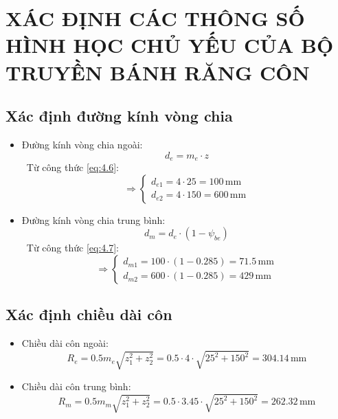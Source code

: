     \section{XÁC ĐỊNH CÁC THÔNG SỐ HÌNH HỌC CHỦ YẾU CỦA BỘ TRUYỀN BÁNH RĂNG CÔN}
        \subsection{Xác định đường kính vòng chia}
            \begin{itemize}
                \item Đường kính vòng chia ngoài:
                    \begin{equation}
                        d_e = m_e \cdot z
                        \label{eq:4.6}
                    \end{equation}\
                    Từ công thức \ref{eq:4.6}:
                    \[
                    \Rightarrow
                    \begin{cases}
                        d_{e1} = 4 \cdot 25 = 100 \, \mathrm{mm} \\
                        d_{e2} = 4 \cdot 150 = 600 \, \mathrm{mm}
                    \end{cases}
                    \]
                \item Đường kính vòng chia trung bình:\\
                    \begin{equation}
                        d_m = d_e \cdot (1 - \psi_{be})
                        \label{eq:4.7}
                    \end{equation}\
                    Từ công thức \ref{eq:4.7}:
                    \[
                    \Rightarrow
                    \begin{cases}
                        d_{m1} = 100 \cdot (1 - 0.285) = 71.5 \, \mathrm{mm} \\
                        d_{m2} = 600 \cdot (1 - 0.285) = 429\, \mathrm{mm}
                    \end{cases}
                    \]
            \end{itemize}
        \subsection{Xác định chiều dài côn}
            \begin{itemize}
                \item Chiều dài côn ngoài:
                    \begin{equation}
                        R_e = 0.5m_e\sqrt{z_1^2 + z_2^2} = 0.5 \cdot 4 \cdot \sqrt{25^2 + 150^2} = 304.14 \, \mathrm{mm}
                        \label{eq:4.8}
                    \end{equation}
                \item Chiều dài côn trung bình:
                    \begin{equation}
                        R_m = 0.5m_m\sqrt{z_1^2 + z_2^2} = 0.5 \cdot 3.45 \cdot \sqrt{25^2 + 150^2} = 262.32 \, \mathrm{mm}
                        \label{eq:4.9}
                    \end{equation}
            \end{itemize}

